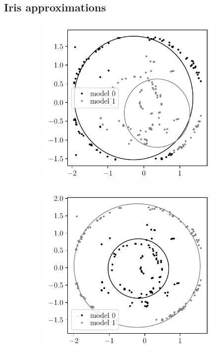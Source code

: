 \documentclass[12pt, twoside]{article}
\numberwithin{equation}{section}
\begin{document}
\subsection{Iris approximations }
\begin{figure}
     \centering
     \begin{subfigure}[b]{0.3\textwidth}
         \centering
         \includegraphics[width=\textwidth]{figures/not_prior_real_example}
         \caption{}
     \end{subfigure}
     \begin{subfigure}[b]{0.3\textwidth}
         \centering
         \includegraphics[width=\textwidth]{figures/prior_real_example}

\end{subfigure}
\end{figure}
\end{document}
